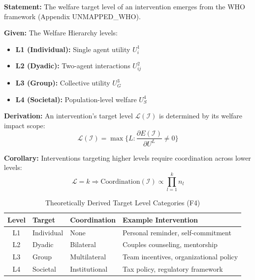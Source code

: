 \begin{tcolorbox}[colback=blue!5!white, colframe=blue!75!black,
    title=\textbf{Theorem HHH-T3: Target Level Emergence from WHO}]

\textbf{Statement:} The welfare target level of an intervention emerges from the WHO framework (Appendix UNMAPPED_WHO).

\textbf{Given:} The Welfare Hierarchy levels:
\begin{itemize}[nosep]
    \item \textbf{L1 (Individual):} Single agent utility $U^1_i$
    \item \textbf{L2 (Dyadic):} Two-agent interactions $U^2_{ij}$
    \item \textbf{L3 (Group):} Collective utility $U^3_G$
    \item \textbf{L4 (Societal):} Population-level welfare $U^4_S$
\end{itemize}

\textbf{Derivation:} An intervention's target level $\mathcal{L}(\mathcal{I})$ is determined by its welfare impact scope:
\begin{equation}
\mathcal{L}(\mathcal{I}) = \max\{ L : \frac{\partial E(\mathcal{I})}{\partial U^L} \neq 0 \}
\label{eq:hhh-level-mapping}
\end{equation}

\textbf{Corollary:} Interventions targeting higher levels require coordination across lower levels:
\begin{equation}
\mathcal{L} = k \Rightarrow \text{Coordination}(\mathcal{I}) \propto \prod_{l=1}^{k} n_l
\end{equation}

\end{tcolorbox}

\begin{table}[htbp]
\centering
\caption{Theoretically Derived Target Level Categories (F4)}
\label{tab:hhh-level-derived}
\renewcommand{\arraystretch}{1.3}
\begin{tabular}{@{}cllp{4.5cm}@{}}
\toprule
\textbf{Level} & \textbf{Target} & \textbf{Coordination} & \textbf{Example Intervention} \\
\midrule
L1 & Individual & None & Personal reminder, self-commitment \\
L2 & Dyadic & Bilateral & Couples counseling, mentorship \\
L3 & Group & Multilateral & Team incentives, organizational policy \\
L4 & Societal & Institutional & Tax policy, regulatory framework \\
\bottomrule
\end{tabular}
\end{table}


